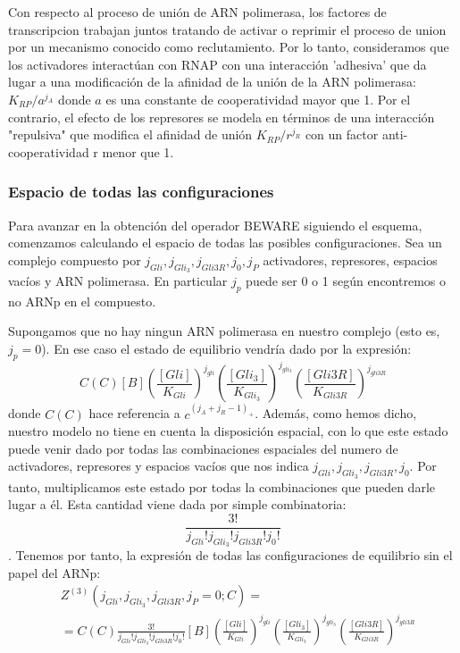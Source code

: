 Con respecto al proceso de unión de ARN polimerasa, los factores de transcripcion trabajan juntos tratando de activar o reprimir el proceso de union por un mecanismo conocido como reclutamiento. Por lo tanto, consideramos que los activadores interactúan con RNAP con una interacción 'adhesiva' que da lugar a una modificación de la afinidad de la unión de la ARN polimerasa: $K_{RP} / a^{j_A}$ donde $a$ es una constante de cooperatividad mayor que 1. Por el contrario, el efecto de los represores se modela en términos de una interacción "repulsiva" que modifica el afinidad de unión  $K_{RP} / r^{j_R}$ con un factor anti-cooperatividad r menor que 1.

\subsubsection{Espacio de todas las configuraciones}
Para avanzar en la obtención del operador BEWARE siguiendo el esquema, comenzamos calculando el espacio de todas las posibles configuraciones.
Sea un complejo compuesto por $j_{Gli}, j_{Gli_3}, j_{Gli3R}, j_0, j_P$ activadores, represores, espacios vacíos y ARN polimerasa. En particular $j_p$ puede ser 0 o 1 según encontremos o no ARNp en el compuesto.

Supongamos que no hay ningun ARN polimerasa en nuestro complejo (esto es, $j_p=0$). En ese caso el estado de equilibrio vendría dado por la expresión:
\begin{equation}
\textit{C}(C)[B]
\left(\frac{[Gli]}{K_{Gli}}\right)^{j_{gli}}
\left(\frac{[Gli_3]}{K_{Gli_3}}\right)^{j_{gli_3}}
\left(\frac{[Gli3R]}{K_{Gli3R}}\right)^{j_{gli3R}}
\end{equation}
donde $\textit{C}(C)$ hace referencia a $c^{(j_A+j_R-1)_+}$. Además, como hemos dicho, nuestro modelo no tiene en cuenta la disposición espacial, con lo que este estado puede venir dado por todas las combinaciones espaciales del numero de activadores, represores y espacios vacíos que nos indica $j_{Gli}, j_{Gli_3}, j_{Gli3R}, j_0$. Por tanto, multiplicamos este estado por todas la combinaciones que pueden darle lugar a él. Esta cantidad viene dada por simple combinatoria: $$\frac{3!}{j_{Gli}! j_{Gli_3}! j_{Gli3R}! j_0!}$$.
Tenemos por tanto, la expresión de todas las configuraciones de equilibrio sin el papel del ARNp:
\begin{equation}
\begin{split}
&Z^{(3)}(j_{Gli}, j_{Gli_3}, j_{Gli3R},j_P=0;C)=\\&=\textit{C}(C)\frac{3!}{j_{Gli}! j_{Gli_3}! j_{Gli3R}!j_0!}[B]
\left(\frac{[Gli]}{K_{Gli}}\right)^{j_{gli}}
\left(\frac{[Gli_3]}{K_{Gli_3}}\right)^{j_{gli_3}}
\left(\frac{[Gli3R]}{K_{Gli3R}}\right)^{j_{gli3R}}
\end{split}
\end{equation}

